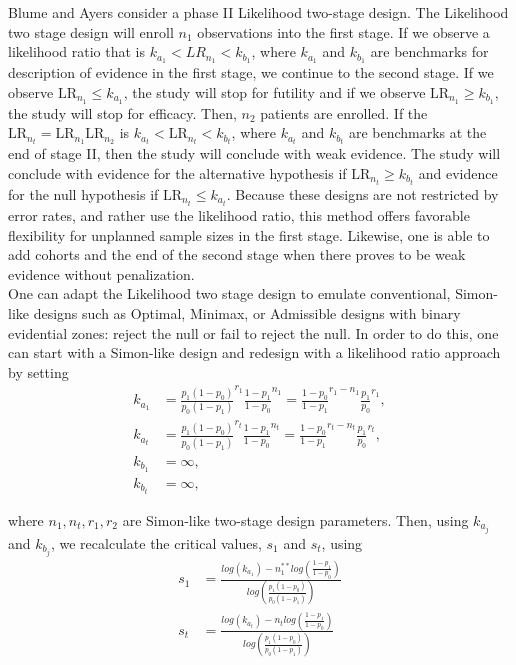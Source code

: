 \documentclass[12pt]{report}\usepackage[]{graphicx}\usepackage[]{color}
\newlength{\li}\setlength{\li}{14.48pt}
\begin{document}
\indent Blume and Ayers \cite{Blume} consider a phase II Likelihood two-stage design. The Likelihood two stage design will enroll $n_1$ observations into the first stage. If we observe a likelihood ratio that is $k_{a_1} < LR_{n_1} < k_{b_1}$, where $k_{a_1}$ and $k_{b_1}$ are benchmarks for description of evidence in the first stage, we continue to the second stage. If we observe $\mbox{LR}_{n_1} \leq k_{a_1}$, the study will stop for futility and if we observe $\mbox{LR}_{n_1} \geq k_{b_1}$, the study will stop for efficacy. Then, $n_2$ patients are enrolled. If the $\mbox{LR}_{n_t} = \mbox{LR}_{n_1}\mbox{LR}_{n_2}$ is $k_{a_t} < \mbox{LR}_{n_t} < k_{b_t}$, where $k_{a_t}$ and $k_{b_t}$ are benchmarks at the end of stage II, then the study will conclude with weak evidence. The study will conclude with evidence for the alternative hypothesis if $\mbox{LR}_{n_t} \geq k_{b_t}$ and evidence for the null hypothesis if $\mbox{LR}_{n_t} \leq k_{a_t}$. Because these designs are not restricted by error rates, and rather use the likelihood ratio, this method offers favorable flexibility for unplanned sample sizes in the first stage. Likewise, one is able to add cohorts and the end of the second stage when there proves to be weak evidence without penalization. \\

\indent One can adapt the Likelihood two stage design to emulate conventional, Simon-like designs such as Optimal, Minimax, or Admissible designs with binary evidential zones: reject the null or fail to reject the null. In order to do this, one can start with a Simon-like design and redesign with a likelihood ratio approach by setting
\begin{equation*}
\begin{aligned}
k_{a_1} &= \frac{p_1(1-p_0)}{p_0(1-p_1)}^{r_1} \frac{1-p_1}{1-p_0}^{n_1} = \frac{1-p_0}{1-p_1}^{r_1-n_1}\frac{p_1}{p_0}^{r_1},\\ k_{a_t}  &= \frac{p_1(1-p_0)}{p_0(1-p_1)}^{r_t} \frac{1-p_1}{1-p_0}^{n_t} = \frac{1-p_0}{1-p_1}^{r_t-n_t}\frac{p_1}{p_0}^{r_t},\\ k_{b_1} &= \infty, \\
k_{b_t} &= \infty,
\end{aligned}
\end{equation*}

where $n_1, n_t, r_1, r_2$ are Simon-like two-stage design parameters. Then, using $k_{a_j}$ and $k_{b_j}$, we recalculate the critical values, $s_1$ and $s_t$, using
\begin{equation*}
\begin{aligned}
s_1 &= \frac{log(k_{a_1}) - n_1^{\ast\ast} log(\frac{1-p_1}{1-p_0})}{log(\frac{p_1(1-p_0)}{p_0(1-p_1)})} \\
s_t &= \frac{log(k_{a_t}) - n_t log(\frac{1-p_1}{1-p_0})}{log(\frac{p_1(1-p_0)}{p_0(1-p_1)})}
\end{aligned}
\end{equation*}
\end{document}
